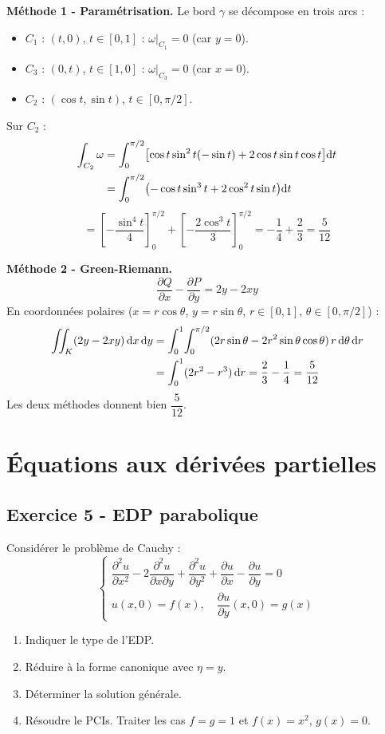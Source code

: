 \documentclass[12pt,a4paper]{article}
\begin{document}
\begin{boitecorrige}
\textbf{Méthode 1 - Paramétrisation.} Le bord $\gamma$ se décompose en trois arcs :
\begin{itemize}[nosep]
  \item $C_1$ : $(t,0)$, $t\in[0,1]$ : $\omega|_{C_1}=0$ (car $y=0$).
  \item $C_3$ : $(0,t)$, $t\in[1,0]$ : $\omega|_{C_3}=0$ (car $x=0$).
  \item $C_2$ : $(\cos t,\sin t)$, $t\in[0,\pi/2]$.
\end{itemize}
Sur $C_2$ :
\begin{align*}
\int_{C_2}\omega &= \int_0^{\pi/2}\bigl[\cos t\sin^2 t(-\sin t) + 2\cos t\sin t\cos t\bigr]\mathrm{d} t\\
&= \int_0^{\pi/2}\bigl(-\cos t\sin^3 t + 2\cos^2 t\sin t\bigr)\mathrm{d} t
\end{align*}
\[
= \left[-\frac{\sin^4 t}{4}\right]_0^{\pi/2} + \left[-\frac{2\cos^3 t}{3}\right]_0^{\pi/2}
= -\frac{1}{4} + \frac{2}{3} = \frac{5}{12}
\]

\textbf{Méthode 2 - Green-Riemann.}
\[
\frac{\partial Q}{\partial x} - \frac{\partial P}{\partial y} = 2y - 2xy
\]
En coordonnées polaires ($x=r\cos\theta$, $y=r\sin\theta$, $r\in[0,1]$, $\theta\in[0,\pi/2]$) :
\begin{align*}
\iint_K(2y-2xy)\,\mathrm{d} x\,\mathrm{d} y &= \int_0^1\!\int_0^{\pi/2}(2r\sin\theta - 2r^2\sin\theta\cos\theta)\,r\,\mathrm{d}\theta\,\mathrm{d} r\\
&= \int_0^1(2r^2-r^3)\,\mathrm{d} r = \frac{2}{3}-\frac{1}{4} = \frac{5}{12}
\end{align*}
Les deux méthodes donnent bien $\dfrac{5}{12}$.
\end{boitecorrige}

\section{Équations aux dérivées partielles}

\subsection*{Exercice 5 - EDP parabolique \niveau{\difficile}}

\begin{boiteexercice}
Considérer le problème de Cauchy :
\[
\begin{cases}
\dfrac{\partial^2 u}{\partial x^2} - 2\dfrac{\partial^2 u}{\partial x\partial y} + \dfrac{\partial^2 u}{\partial y^2} + \dfrac{\partial u}{\partial x} - \dfrac{\partial u}{\partial y} = 0\\[4pt]
u(x,0)=f(x),\quad \dfrac{\partial u}{\partial y}(x,0)=g(x)
\end{cases}
\]
\begin{enumerate}
  \item Indiquer le type de l'EDP.
  \item Réduire à la forme canonique avec $\eta=y$.
  \item Déterminer la solution générale.
  \item Résoudre le PCIs. Traiter les cas $f=g=1$ et $f(x)=x^2$, $g(x)=0$.
\end{enumerate}
\end{boiteexercice}
\end{document}
